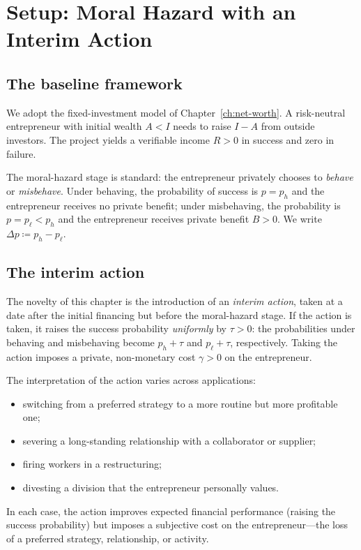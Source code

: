\documentclass[11pt,a4paper,oneside]{book}
\theoremstyle{plain}
\theoremstyle{definition}
\theoremstyle{remark}
\numberwithin{equation}{chapter}
\begin{document}
\section{Setup: Moral Hazard with an Interim Action}
\label{sec:control-setup}

\subsection{The baseline framework}

We adopt the fixed-investment model of Chapter~\ref{ch:net-worth}.
A risk-neutral entrepreneur with initial wealth $A < I$ needs to raise $I - A$ from outside investors.
The project yields a verifiable income $R > 0$ in success and zero in failure.

The moral-hazard stage is standard: the entrepreneur privately chooses to \emph{behave} or \emph{misbehave}.
Under behaving, the probability of success is $p = p_h$ and the entrepreneur receives no private benefit; under misbehaving, the probability is $p = p_\ell < p_h$ and the entrepreneur receives private benefit $B > 0$.
We write $\Delta p \coloneqq p_h - p_\ell$.

\subsection{The interim action}

The novelty of this chapter is the introduction of an \emph{interim action}, taken at a date after the initial financing but before the moral-hazard stage.
If the action is taken, it raises the success probability \emph{uniformly} by $\tau > 0$: the probabilities under behaving and misbehaving become $p_h + \tau$ and $p_\ell + \tau$, respectively.
Taking the action imposes a private, non-monetary cost $\gamma > 0$ on the entrepreneur.

The interpretation of the action varies across applications:
\begin{itemize}
  \item switching from a preferred strategy to a more routine but more profitable one;
  \item severing a long-standing relationship with a collaborator or supplier;
  \item firing workers in a restructuring;
  \item divesting a division that the entrepreneur personally values.
\end{itemize}
In each case, the action improves expected financial performance (raising the success probability) but imposes a subjective cost on the entrepreneur---the loss of a preferred strategy, relationship, or activity.
\end{document}
